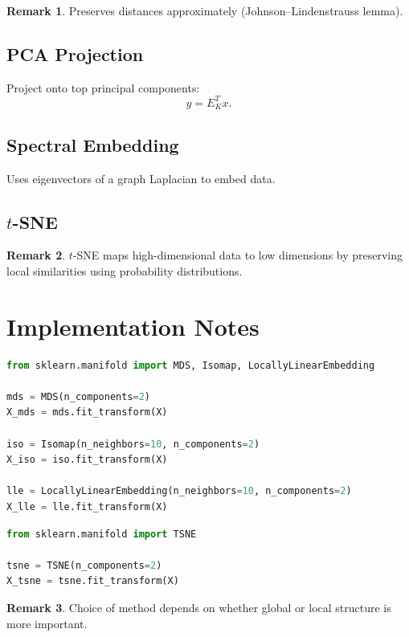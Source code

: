 \documentclass[12pt,oneside]{book}
\numberwithin{equation}{section}
\theoremstyle{definition}
\newtheorem{remark}{Remark}[section]
\theoremstyle{plain}
\theoremstyle{remark}
\begin{document}
\begin{remark}
Preserves distances approximately (Johnson–Lindenstrauss lemma).
\end{remark}

\subsection{PCA Projection}

Project onto top principal components:
\[
y = E_K^T x.
\]

\subsection{Spectral Embedding}

Uses eigenvectors of a graph Laplacian to embed data.

\subsection{$t$-SNE}

\begin{remark}
$t$-SNE maps high-dimensional data to low dimensions by preserving local similarities using probability distributions.
\end{remark}

\section{Implementation Notes}

\begin{lstlisting}[language=Python]
from sklearn.manifold import MDS, Isomap, LocallyLinearEmbedding

mds = MDS(n_components=2)
X_mds = mds.fit_transform(X)

iso = Isomap(n_neighbors=10, n_components=2)
X_iso = iso.fit_transform(X)

lle = LocallyLinearEmbedding(n_neighbors=10, n_components=2)
X_lle = lle.fit_transform(X)
\end{lstlisting}

\begin{lstlisting}[language=Python]
from sklearn.manifold import TSNE

tsne = TSNE(n_components=2)
X_tsne = tsne.fit_transform(X)
\end{lstlisting}

\begin{remark}
Choice of method depends on whether global or local structure is more important.
\end{remark}
\end{document}
